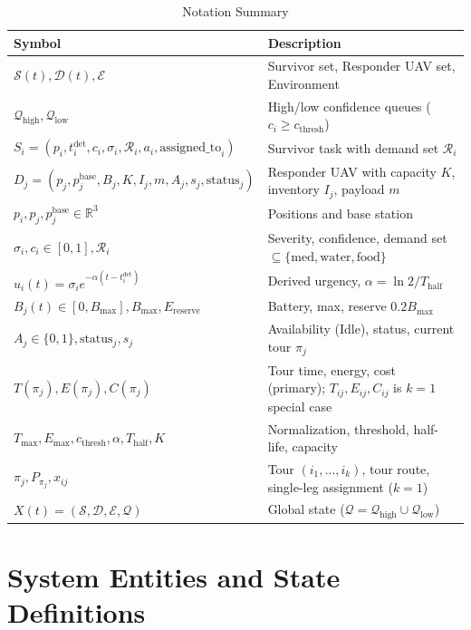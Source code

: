 \documentclass[conference]{IEEEtran}
\begin{document}
\begin{table}[h]
\centering
\caption{Notation Summary}
\label{tab:notation}
\begin{tabularx}{\columnwidth}{l X}
\toprule
\textbf{Symbol} & \textbf{Description} \\
\midrule
$\mathcal{S}(t), \mathcal{D}(t), \mathcal{E}$ & Survivor set, Responder UAV set, Environment \\
$\mathcal{Q}_{\text{high}}, \mathcal{Q}_{\text{low}}$ & High/low confidence queues ($c_i \geq c_{\text{thresh}}$) \\
$S_i=(p_i,t_i^{\text{det}},c_i,\sigma_i,\mathcal{R}_i,a_i,\text{assigned\_to}_i)$ & Survivor task with demand set $\mathcal{R}_i$ \\
$D_j=(p_j,p_j^{\text{base}},B_j,K,I_j,m,A_j,s_j,\text{status}_j)$ & Responder UAV with capacity $K$, inventory $I_j$, payload $m$ \\
$p_i, p_j, p_j^{\text{base}} \in \mathbb{R}^3$ & Positions and base station \\
$\sigma_i, c_i\in[0,1], \mathcal{R}_i$ & Severity, confidence, demand set $\subseteq\{\text{med},\text{water},\text{food}\}$ \\
$u_i(t)=\sigma_i e^{-\alpha(t-t_i^{\text{det}})}$ & Derived urgency, $\alpha=\ln2/T_{\text{half}}$ \\
$B_j(t)\in[0,B_{\max}], B_{\max}, E_{\text{reserve}}$ & Battery, max, reserve $0.2B_{\max}$ \\
$A_j\in\{0,1\}, \text{status}_j, s_j$ & Availability (Idle), status, current tour $\pi_j$ \\
$T(\pi_j), E(\pi_j), C(\pi_j)$ & Tour time, energy, cost (primary); $T_{ij},E_{ij},C_{ij}$ is $k=1$ special case \\
$T_{\max},E_{\max}, c_{\text{thresh}}, \alpha, T_{\text{half}}, K$ & Normalization, threshold, half-life, capacity \\
$\pi_j, P_{\pi_j}, x_{ij}$ & Tour $(i_1,\dots,i_k)$, tour route, single-leg assignment ($k=1$) \\
$X(t)=(\mathcal{S},\mathcal{D},\mathcal{E},\mathcal{Q})$ & Global state ($\mathcal{Q}=\mathcal{Q}_{\text{high}}\cup\mathcal{Q}_{\text{low}}$) \\
\bottomrule
\end{tabularx}
\end{table}

\section{System Entities and State Definitions}
\end{document}
